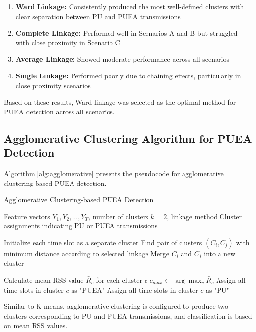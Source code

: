 \begin{enumerate}
    \item \textbf{Ward Linkage:} Consistently produced the most well-defined clusters with clear separation between PU and PUEA transmissions
    \item \textbf{Complete Linkage:} Performed well in Scenarios A and B but struggled with close proximity in Scenario C
    \item \textbf{Average Linkage:} Showed moderate performance across all scenarios
    \item \textbf{Single Linkage:} Performed poorly due to chaining effects, particularly in close proximity scenarios
\end{enumerate}

Based on these results, Ward linkage was selected as the optimal method for PUEA detection across all scenarios.

\subsection{Agglomerative Clustering Algorithm for PUEA Detection}

Algorithm \ref{alg:agglomerative} presents the pseudocode for agglomerative clustering-based PUEA detection.

\begin{algorithm}
\caption{Agglomerative Clustering-based PUEA Detection}
\label{alg:agglomerative}
\begin{algorithmic}[1]
\Require Feature vectors $Y_1, Y_2, \ldots, Y_T$, number of clusters $k=2$, linkage method
\Ensure Cluster assignments indicating PU or PUEA transmissions

\State Initialize each time slot as a separate cluster
    \State Find pair of clusters $(C_i, C_j)$ with minimum distance according to selected linkage
    \State Merge $C_i$ and $C_j$ into a new cluster
\EndWhile

\State Calculate mean RSS value $\bar{R}_c$ for each cluster $c$
\State $c_{max} \gets \arg\max_c \bar{R}_c$ 
        \State Assign all time slots in cluster $c$ as "PUEA"
    \Else
        \State Assign all time slots in cluster $c$ as "PU"
    \EndIf
\EndFor

\end{algorithmic}
\end{algorithm}

Similar to K-means, agglomerative clustering is configured to produce two clusters corresponding to PU and PUEA transmissions, and classification is based on mean RSS values.

